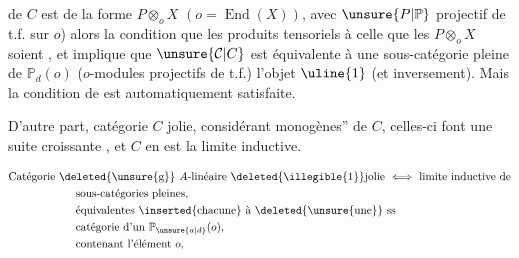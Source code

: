 de $C$ est de la forme $P\otimes_o X$ $(o=\operatorname{End}(X))$, avec $\unsure{P|\mathbb{P}}$ projectif de t.f. sur $o$) alors la condition que les produits tensoriels    à celle que  les $P\otimes_o X$ soient , et implique que $\unsure{\mathcal{C}|C}$ est équivalente à une sous-catégorie pleine de $\mathbb{P}_d(o)$ ($o$-modules  projectifs de t.f.)   l'objet $\uline{1}$ (et inversement). Mais la condition de  est automatiquement satisfaite.

D'autre part,  catégorie  $C$ jolie, considérant  monogènes'' de $C$, celles-ci font une suite croissante , et $C$ en est la limite inductive.

\[
\begin{aligned}
&\text{Catégorie }\deleted{\text{\unsure{g}}}\ A\text{-linéaire }\deleted{\text{\illegible{1}}}\text{jolie}\ \Longleftrightarrow\ \text{limite inductive de}\\
&\qquad\qquad\qquad\text{sous-catégories pleines,}\\
&\qquad\qquad\qquad\text{équivalentes}\ \inserted{\text{chacune}}\ \text{à}\ \deleted{\text{\unsure{une}}}\ \text{ss}\\
&\qquad\qquad\qquad\text{catégorie d'un }\mathbb{P}_{\unsure{a|d}}(o),\\
&\qquad\qquad\qquad\text{contenant l'élément }o,
\end{aligned}
\]
\margin{(}
